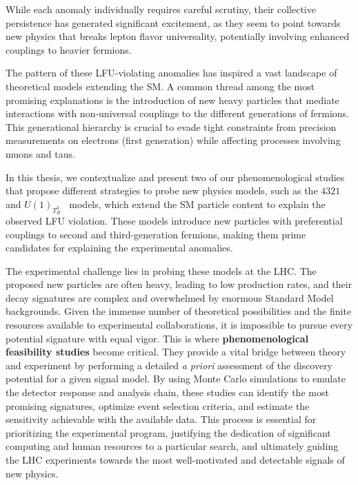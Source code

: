 While each anomaly individually requires careful scrutiny, their collective persistence has generated significant excitement, as they seem to point towards new physics that breaks lepton flavor universality, potentially involving enhanced couplings to heavier fermions.


The pattern of these LFU-violating anomalies has inspired a vast landscape of theoretical models extending the SM. A common thread among the most promising explanations is the introduction of new heavy particles that mediate interactions with non-universal couplings to the different generations of fermions. This generational hierarchy is crucial to evade tight constraints from precision measurements on electrons (first generation) while affecting processes involving muons and taus.

In this thesis, we contextualize and present two of our phenomenological studies that propose different strategies to probe new physics models, such as the $4321$~\cite{Florez2023} and $U(1)_{T^3_R}$~\cite{Qureshi:2024naw} models, which extend the SM particle content to explain the observed LFU violation. These models introduce new particles with preferential couplings to second and third-generation fermions, making them prime candidates for explaining the experimental anomalies.

The experimental challenge lies in probing these models at the LHC. The proposed new particles are often heavy, leading to low production rates, and their decay signatures are complex and overwhelmed by enormous Standard Model backgrounds. Given the immense number of theoretical possibilities and the finite resources available to experimental collaborations, it is impossible to pursue every potential signature with equal vigor. This is where \textbf{phenomenological feasibility studies} become critical. They provide a vital bridge between theory and experiment by performing a detailed \textit{a priori} assessment of the discovery potential for a given signal model. By using Monte Carlo simulations to emulate the detector response and analysis chain, these studies can identify the most promising signatures, optimize event selection criteria, and estimate the sensitivity achievable with the available data. This process is essential for prioritizing the experimental program, justifying the dedication of significant computing and human resources to a particular search, and ultimately guiding the LHC experiments towards the most well-motivated and detectable signals of new physics.

